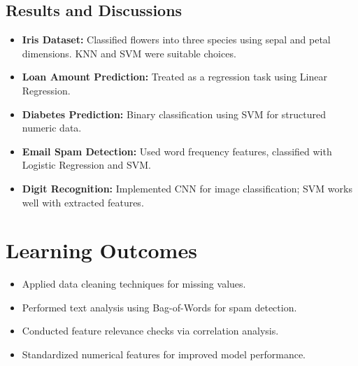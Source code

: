 \documentclass[12pt]{article}
\begin{document}
\subsection*{Results and Discussions}
\begin{itemize}
    \item \textbf{Iris Dataset:} Classified flowers into three species using sepal and petal dimensions. KNN and SVM were suitable choices.
    
    \item \textbf{Loan Amount Prediction:} Treated as a regression task using Linear Regression.
    
    \item \textbf{Diabetes Prediction:} Binary classification using SVM for structured numeric data.
    
    \item \textbf{Email Spam Detection:} Used word frequency features, classified with Logistic Regression and SVM.
    
    \item \textbf{Digit Recognition:} Implemented CNN for image classification; SVM works well with extracted features.
\end{itemize}

\section{Learning Outcomes}
\begin{itemize}
    \item Applied data cleaning techniques for missing values.
    \item Performed text analysis using Bag-of-Words for spam detection.
    \item Conducted feature relevance checks via correlation analysis.
    \item Standardized numerical features for improved model performance.
\end{itemize}
\end{document}
